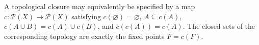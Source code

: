 
A topological closure may equivalently be specified by a map $c:\mathcal P(X)\to\mathcal P(X)$ satisfying $c(\varnothing)=\varnothing$, $A\subseteq c(A)$, $c(A\cup B)=c(A)\cup c(B)$, and $c(c(A))=c(A)$. The closed sets of the corresponding topology are exactly the fixed points $F=c(F)$.
